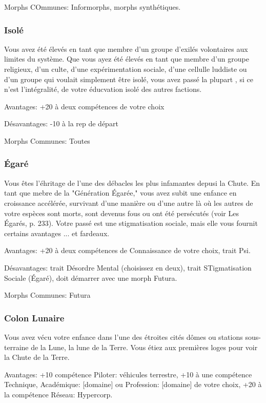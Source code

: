 Morphs COmmunes: Informorphs, morphs synthétiques. 

\subsubsection{Isolé} \label{sec:isolite} 

Vous avez été élevés en tant que membre d'un groupe d'exilés volontaires aux limites du système. Que vous ayez été élevés en tant que membre d'un groupe religieux, d'un culte, d'une expérimentation sociale, d'une cellulle luddiste ou d'un groupe qui voulait simplement être isolé, vous avez passé la plupart , si ce n'est l'intégralité, de votre éducvation isolé des autres factions. 

Avantages: +20 à deux compétences de votre choix 

Désavantages: -10 à la rep de départ 

Morphs Communes: Toutes 

\subsubsection{Égaré} \label{sec:lost} 

Vous êtes l'éhritage de l'une des débacles les plus infamantes depusi la Chute. En tant que mebre de la "Génération Égarée," vous avez subit une enfance en croissance accélérée, survivant d'une manière ou d'une autre là où les autres de votre espèces sont morts, sont devenus fous ou ont été persécutés (voir Les Égarés, p. 233). Votre passé est une stigmatisation sociale, mais elle vous fournit certains avantages ... et fardeaux. 

Avantages: +20 à deux compétences de Connaissance de votre choix, trait Psi. 

Désavantages: trait Désordre Mental (choisissez en deux), trait STigmatisation Sociale (Égaré), doit démarrer avec une morph Futura. 

Morphs Communes: Futura 

\subsubsection{Colon Lunaire} \label{sec:lunar-colonist} 

Vous avez vécu votre enfance dans l'une des étroites cités dômes ou stations sous-terraine de la Lune, la lune de la Terre. Vous étiez aux premières loges pour voir la Chute de la Terre. 

Avantages: +10 compétence Piloter: véhicules terrestre, +10 à une compétence Technique, Académique: [domaine] ou Profession: [domaine] de votre choix, +20 à la compétence Réseau: Hypercorp. 

